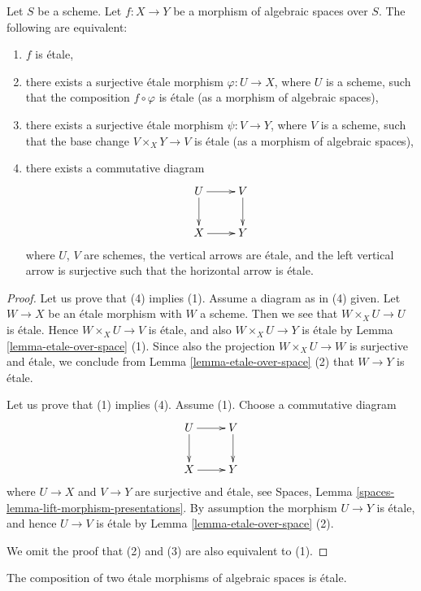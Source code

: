 \begin{lemma}
\label{lemma-etale-local}
Let $S$ be a scheme.
Let $f : X \to Y$ be a morphism of algebraic spaces over $S$.
The following are equivalent:
\begin{enumerate}
\item $f$ is \'etale,
\item there exists a surjective \'etale morphism $\varphi : U \to X$,
where $U$ is a scheme, such that the composition $f \circ \varphi$ is
\'etale (as a morphism of algebraic spaces),
\item there exists a surjective \'etale morphism $\psi : V \to Y$,
where $V$ is a scheme, such that the base change $V \times_X Y \to V$
is \'etale (as a morphism of algebraic spaces),
\item there exists a commutative diagram
$$
\xymatrix{
U \ar[d] \ar[r] & V \ar[d] \\
X \ar[r] & Y
}
$$
where $U$, $V$ are schemes, the vertical arrows are \'etale, and the
left vertical arrow is surjective such that the horizontal arrow is \'etale.
\end{enumerate}
\end{lemma}

\begin{proof}
Let us prove that (4) implies (1). Assume a diagram as in (4) given.
Let $W \to X$ be an \'etale morphism with $W$ a scheme. Then we see
that $W \times_X U \to U$ is \'etale. Hence $W \times_X U \to V$ is \'etale,
and also $W \times_X U \to Y$ is \'etale by
Lemma \ref{lemma-etale-over-space} (1). Since also
the projection $W \times_X U \to W$ is surjective and \'etale, we conclude
from Lemma \ref{lemma-etale-over-space} (2) that $W \to Y$ is \'etale.

\medskip\noindent
Let us prove that (1) implies (4). Assume (1). Choose a commutative diagram
$$
\xymatrix{
U \ar[d] \ar[r] & V \ar[d] \\
X \ar[r] & Y
}
$$
where $U \to X$ and $V \to Y$ are surjective and \'etale, see
Spaces, Lemma \ref{spaces-lemma-lift-morphism-presentations}.
By assumption the morphism $U \to Y$ is \'etale,
and hence $U \to V$ is \'etale by Lemma \ref{lemma-etale-over-space} (2).

\medskip\noindent
We omit the proof that (2) and (3) are also equivalent to (1).
\end{proof}

\begin{lemma}
\label{lemma-composition-etale}
The composition of two \'etale morphisms of algebraic spaces
is \'etale.
\end{lemma}

